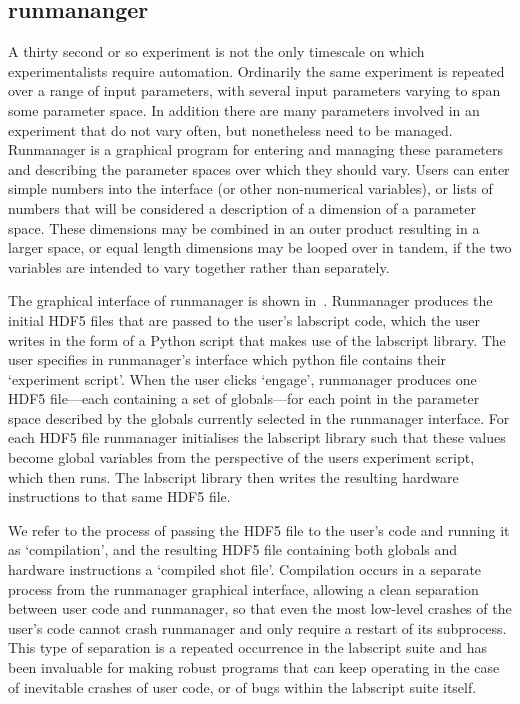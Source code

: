 \subsection{runmananger}

A thirty second or so experiment is not the only timescale on which experimentalists require automation. Ordinarily the same experiment is repeated over a range of input parameters, with several input parameters varying to span some parameter space. In addition there are many parameters involved in an experiment that do not vary often, but nonetheless need to be managed. Runmanager is a graphical program for entering and managing these parameters and describing the parameter spaces over which they should vary. Users can enter simple numbers into the interface (or other non-numerical variables), or lists of numbers that will be considered a description of a dimension of a parameter space. These dimensions may be combined in an outer product resulting in a larger space, or equal length dimensions may be looped over in tandem, if the two variables are intended to vary together rather than separately.

The graphical interface of runmanager is shown in~. Runmanager produces the initial HDF5 files that are passed to the user's labscript code, which the user writes in the form of a Python script that makes use of the labscript library. The user specifies in runmanager's interface which python file contains their `experiment script'. When the user clicks `engage', runmanager produces one HDF5 file---each containing a set of globals---for each point in the parameter space described by the globals currently selected in the runmanager interface. For each HDF5 file runmanager initialises the labscript library such that these values become global variables from the perspective of the users experiment script, which then runs. The labscript library then writes the resulting hardware instructions to that same HDF5 file.

We refer to the process of passing the HDF5 file to the user's code and running it as `compilation', and the resulting HDF5 file containing both globals and hardware instructions a `compiled shot file'. Compilation occurs in a separate process from the runmanager graphical interface, allowing a clean separation between user code and runmanager, so that even the most low-level crashes of the user's code cannot crash runmanager and only require a restart of its subprocess. This type of separation is a repeated occurrence in the labscript suite and has been invaluable for making robust programs that can keep operating in the case of inevitable crashes of user code, or of bugs within the labscript suite itself.

